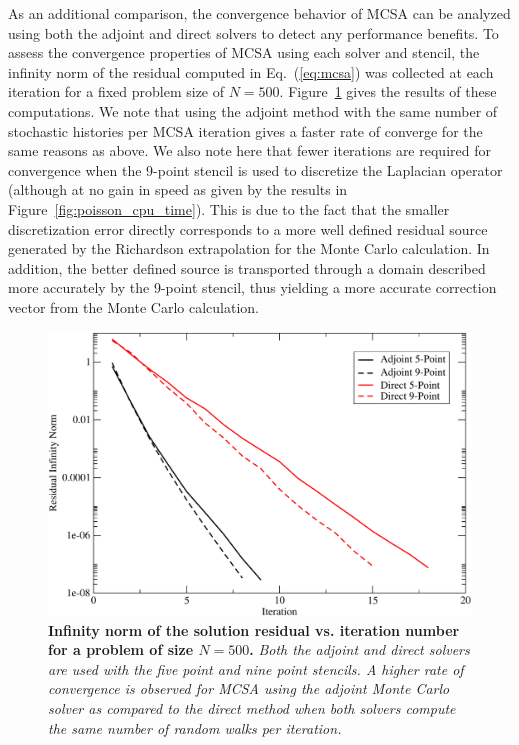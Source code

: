 As an additional comparison, the convergence behavior of MCSA can be
analyzed using both the adjoint and direct solvers to detect any
performance benefits. To assess the convergence properties of MCSA
using each solver and stencil, the infinity norm of the residual
computed in Eq.~(\ref{eq:mcsa}) was collected at each iteration for a
fixed problem size of $N=500$. Figure~\ref{fig:poisson_convergence}
gives the results of these computations. We note that using the
adjoint method with the same number of stochastic histories per MCSA
iteration gives a faster rate of converge for the same reasons as
above. We also note here that fewer iterations are required for
convergence when the 9-point stencil is used to discretize the
Laplacian operator (although at no gain in speed as given by the
results in Figure~\ref{fig:poisson_cpu_time}). This is due to the fact
that the smaller discretization error directly corresponds to a more
well defined residual source generated by the Richardson extrapolation
for the Monte Carlo calculation. In addition, the better defined
source is transported through a domain described more accurately by
the 9-point stencil, thus yielding a more accurate correction vector
from the Monte Carlo calculation.

\begin{figure}[t!]
  \centering
  \includegraphics[width=5in,clip]{chapters/mc_background/dir_adj_conv.pdf}
  \caption{\textbf{Infinity norm of the solution residual
      vs. iteration number for a problem of size $N=500$.}
    \textit{Both the adjoint and direct solvers are used with the five
      point and nine point stencils. A higher rate of convergence is
      observed for MCSA using the adjoint Monte Carlo solver as
      compared to the direct method when both solvers compute the same
      number of random walks per iteration.}}
  \label{fig:poisson_convergence}
\end{figure}

